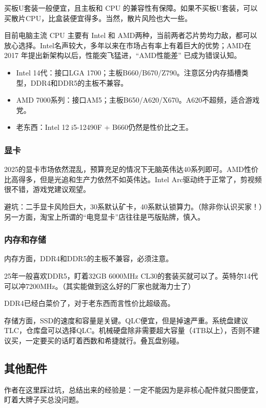 \documentclass[../main.tex]{subfiles}
\begin{document}
买板U套装一般便宜，且主板和 CPU 的兼容性有保障。如果不买板U套装，可以买散片CPU，比盒装便宜得多。当然，散片风险也大一些。

目前电脑主流 CPU 主要有 Intel 和 AMD两种，当前两者芯片势均力敌，都可以放心选择。Intel名声较大，多年以来在市场占有率上有着巨大的优势；AMD在2017 年提出新架构以后，性能突飞猛进，“AMD性能差” 已成为错误认知。

\begin{itemize}
    \item Intel 14代：接口LGA 1700；主板B660/B670/Z790。注意区分内存插槽类型，DDR4和DDR5的主板不兼容。
    \item AMD 7000系列：接口AM5；主板B650/A620/X670。A620不超频，适合游戏党。
    \item 老东西：Intel 12 i5-12490F + B660仍然是性价比之王。
\end{itemize}

\subsubsection{显卡}

2025的显卡市场依然混乱，预算充足的情况下无脑英伟达40系列即可。AMD性价比高得多，但是光追和生产力依然不如英伟达。Intel Arc驱动终于正常了，剪视频很不错，游戏党建议观望。

避坑：二手显卡风险巨大，30系默认矿卡，40系默认锁算力。（除非你认识买家！）另一方面，淘宝上所谓的“电竞显卡”店往往是丐版贴牌，慎入。

\subsubsection{内存和存储}

内存方面，DDR4和DDR5的主板不兼容，必须注意。

25年一般喜欢DDR5，盯着32GB 6000MHz CL30的套装买就可以了。英特尔14代可以冲7200MHz。（其实能做到这么好的厂家也就海力士了）

DDR4已经白菜价了，对于老东西而言性价比超级高。

存储方面，SSD的速度和容量是关键。QLC便宜，但是掉速严重。系统盘建议TLC，仓库盘可以选择QLC。机械硬盘除非需要超大容量（4TB以上），否则不建议买，一定要买的话盯着西数和希捷就行。叠瓦盘别碰。

\subsection{其他配件}

作者在这里踩过坑，总结出来的经验是：一定不能因为是非核心配件就只图便宜，盯着大牌子买总没问题。
\end{document}
